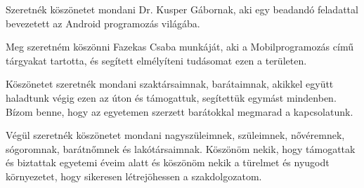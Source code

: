 \documentclass[
]{thesis-ekf}
\theoremstyle{definition}
\theoremstyle{remark}
\begin{document}
	Szeretnék köszönetet mondani Dr. Kusper Gábornak, aki egy beadandó feladattal bevezetett az Android programozás világába.
	
	Meg szeretném köszönni Fazekas Csaba munkáját, aki a Mobilprogramozás című tárgyakat tartotta, és segített elmélyíteni tudásomat ezen a területen.
	
	Köszönetet szeretnék mondani szaktársaimnak, barátaimnak, akikkel együtt haladtunk végig ezen az úton és támogattuk, segítettük egymást mindenben. Bízom benne, hogy az egyetemen szerzett barátokkal megmarad a kapcsolatunk. 
	
	Végül szeretnék köszönetet mondani nagyszüleimnek, szüleimnek, nővéremnek, sógoromnak, barátnőmnek és lakótársaimnak. Köszönöm nekik, hogy támogattak és biztattak egyetemi éveim alatt és köszönöm nekik a türelmet és nyugodt környezetet, hogy sikeresen létrejöhessen a szakdolgozatom.
	
\end{document}
